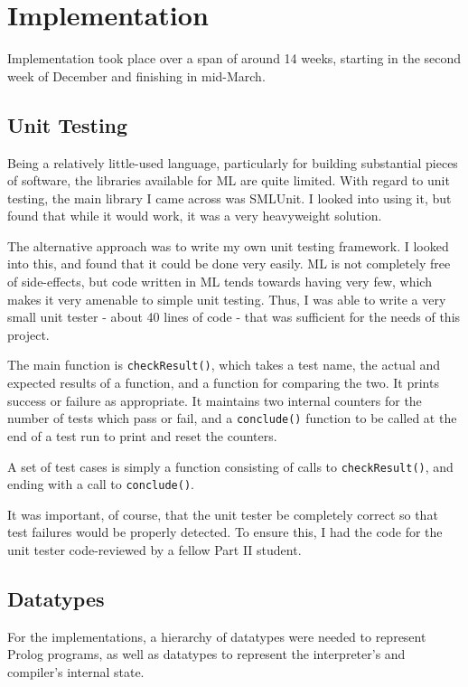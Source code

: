 \documentclass[12pt]{article}
\begin{document}
\section{Implementation}


Implementation took place over a span of around 14 weeks, starting in the second week of December and finishing in mid-March. 

\subsection{Unit Testing}

Being a relatively little-used language, particularly for building substantial pieces of software, the libraries available for ML are quite limited. 
With regard to unit testing, the main library I came across was SMLUnit. 
I looked into using it, but found that while it would work, it was a very heavyweight solution.

The alternative approach was to write my own unit testing framework. 
I looked into this, and found that it could be done very easily. 
ML is not completely free of side-effects, but code written in ML tends towards having very few, which makes it very amenable to simple unit testing. 
Thus, I was able to write a very small unit tester - about 40 lines of code - that was sufficient for the needs of this project.

The main function is \verb|checkResult()|, which takes a test name, the actual and expected results of a function, and a function for comparing the two. 
It prints success or failure as appropriate. 
It maintains two internal counters for the number of tests which pass or fail, and a \verb|conclude()| function to be called at the end of a test run to print and reset the counters.

A set of test cases is simply a function consisting of calls to \verb|checkResult()|, and ending with a call to \verb|conclude()|.

It was important, of course, that the unit tester be completely correct so that test failures would be properly detected. 
To ensure this, I had the code for the unit tester code-reviewed by a fellow Part II student.

\subsection{Datatypes}

For the implementations, a hierarchy of datatypes were needed to represent Prolog programs, as well as datatypes to represent the interpreter's and compiler's internal state. 
\end{document}
